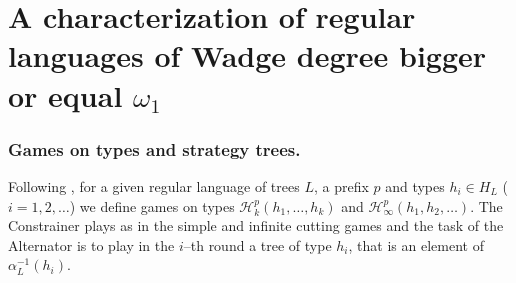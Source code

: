 \section{A characterization of regular languages of Wadge degree bigger or equal $\omega_1$}
\subsubsection*{Games on types and strategy trees.}
Following \cite{bp}, for a given regular language of trees $L$, a prefix $p$ and types $h_i\in H_L$ ($i=1,2,\dots$) we define games on types $\mathcal{H}^p_k(h_1,\dots,h_k)$ and $\mathcal{H}^p_\infty(h_1,h_2,\dots)$. The Constrainer plays as in the simple and infinite cutting games and the task of the Alternator is to play in the $i$--th round a tree of type $h_i$, that is an element of $\alpha_L^{-1}(h_i)$. %

